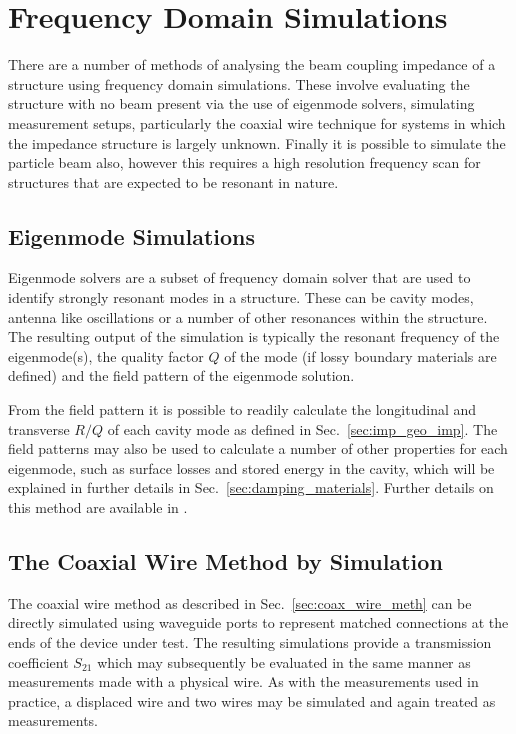 \section{Frequency Domain Simulations}

There are a number of methods of analysing the beam coupling impedance of a structure using frequency domain simulations. These involve evaluating the structure with no beam present via the use of eigenmode solvers, simulating measurement setups, particularly the coaxial wire technique for systems in which the impedance structure is largely unknown. Finally it is possible to simulate the particle beam also, however this requires a high resolution frequency scan for structures that are expected to be resonant in nature.

\subsection{Eigenmode Simulations}

Eigenmode solvers are a subset of frequency domain solver that are used to identify strongly resonant modes in a structure. These can be cavity modes, antenna like oscillations or a number of other resonances within the structure. The resulting output of the simulation is typically the resonant frequency of the eigenmode(s), the quality factor $Q$ of the mode (if lossy boundary materials are defined) and the field pattern of the eigenmode solution.

From the field pattern it is possible to readily calculate the longitudinal and transverse $R/Q$ of each cavity mode as defined in Sec.~\ref{sec:imp_geo_imp}. The field patterns may also be used to calculate a number of other properties for each eigenmode, such as surface losses and stored energy in the cavity, which will be explained in further details in Sec.~\ref{sec:damping_materials}. Further details on this method are available in \cite{Grudiev:LongTransSecCol}.

\subsection{The Coaxial Wire Method by Simulation}

The coaxial wire method as described in Sec.~\ref{sec:coax_wire_meth} can be directly simulated using waveguide ports to represent matched connections at the ends of the device under test. The resulting simulations provide a transmission coefficient $S_{21}$ which may subsequently be evaluated in the same manner as measurements made with a physical wire. As with the measurements used in practice, a displaced wire and two wires may be simulated and again treated as measurements. 

